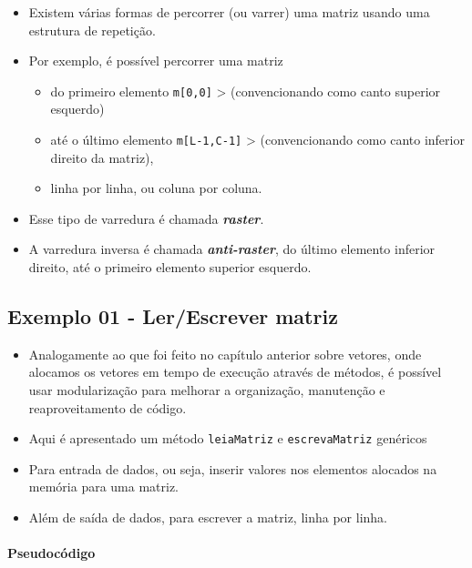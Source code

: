 \documentclass[12pt,a4paper]{article}
\providecommand{\tightlist}{%
      \setlength{\itemsep}{0pt}\setlength{\parskip}{0pt}}
\begin{document}
    \begin{itemize}
\item
  Existem várias formas de percorrer (ou varrer) uma matriz usando uma
  estrutura de repetição.
\item
  Por exemplo, é possível percorrer uma matriz

  \begin{itemize}
  \tightlist
  \item
    do primeiro elemento \texttt{m{[}0,0{]}} \textgreater{}
    (convencionando como canto superior esquerdo)
  \item
    até o último elemento \texttt{m{[}L-1,C-1{]}} \textgreater{}
    (convencionando como canto inferior direito da matriz),
  \item
    linha por linha, ou coluna por coluna.
  \end{itemize}
\item
  Esse tipo de varredura é chamada \textbf{\emph{raster}}.
\item
  A varredura inversa é chamada \textbf{\emph{anti-raster}}, do último
  elemento inferior direito, até o primeiro elemento superior esquerdo.
\end{itemize}

    \hypertarget{exemplo-01---lerescrever-matriz}{%
\subsection{Exemplo 01 - Ler/Escrever
matriz}\label{exemplo-01---lerescrever-matriz}}

    \begin{itemize}
\item
  Analogamente ao que foi feito no capítulo anterior sobre vetores, onde
  alocamos os vetores em tempo de execução através de métodos, é
  possível usar modularização para melhorar a organização, manutenção e
  reaproveitamento de código.
\item
  Aqui é apresentado um método \texttt{leiaMatriz} e
  \texttt{escrevaMatriz} genéricos
\item
  Para entrada de dados, ou seja, inserir valores nos elementos alocados
  na memória para uma matriz.
\item
  Além de saída de dados, para escrever a matriz, linha por linha.
\end{itemize}

    \hypertarget{pseudocuxf3digo}{%
\paragraph{Pseudocódigo}\label{pseudocuxf3digo}}
\end{document}

